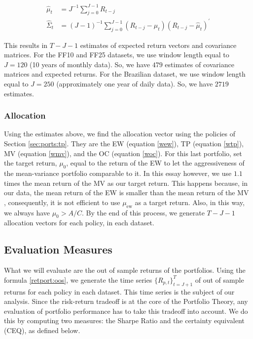 \documentclass[12pt,oneside,a4paper]{memoir}
\begin{document}
\vspace{-18 pt}
\begin{align*}
	\hat{\mu}_{t} &=
	J^{-1} \sum^{J-1}_{j=0} R_{t-j}
	\\
	\hat{\Sigma}_{t} &=
	(J-1)^{-1} \sum^{J-1}_{j=0}
	(R_{t-j} - \hat{\mu}_{t})(R_{t-j} - \hat{\mu}_{t})^{\prime}
\end{align*}

\noindent
This results in $T-J-1$ estimates of expected return vectors and covariance matrices.
For the FF10 and FF25 datasets, we use window length equal to $J=120$ (10 years of monthly data).
So, we have $479$ estimates of covariance matrices and expected returns.
For the Brazilian dataset, we use window length equal to $J=250$ (approximately one year of daily data).
So, we have $2719$ estimates.

\subsubsection*{Allocation}

Using the estimates above, we find the allocation vector using the policies of Section \ref{sec:ports:tp}.
They are the EW (equation \eqref{wew}),
TP (equation \eqref{wtp}),
MV (equation \eqref{wmv}),
and the OC (equation \eqref{woc}).
\noindent
For this last portfolio,  set the target return, \(\mu_{0}\), equal to the return of the EW to let the aggressiveness of the mean-variance portfolio comparable to it.
In this essay however, we use $1.1$ times the mean return of the MV as our target return.
This happens because, in our data, the mean return of the EW is smaller than the mean return of the MV , consequently, it is not efficient to use $\mu_{\mathrm{ew}}$ as a target return.
Also, in this way, we always have $\mu_{0} > A/C$.
By the end of this process, we generate $T-J-1$ allocation vectors for each policy, in each dataset.

\subsection{Evaluation Measures} %

What we will evaluate are the out of sample returns of the portfolios.
Using the formula \eqref{retport:oos}, we generate the time series $\{R_{p,t}\}_{t=J+1}^{T}$ of out of sample returns for each policy in each dataset.
This time series is the subject of our analysis. 
Since the risk-return tradeoff is at the core of the Portfolio Theory, any evaluation of portfolio performance has to take this tradeoff into account.
We do this by computing two measures: the Sharpe Ratio and the certainty equivalent (CEQ), as defined below.
\end{document}
